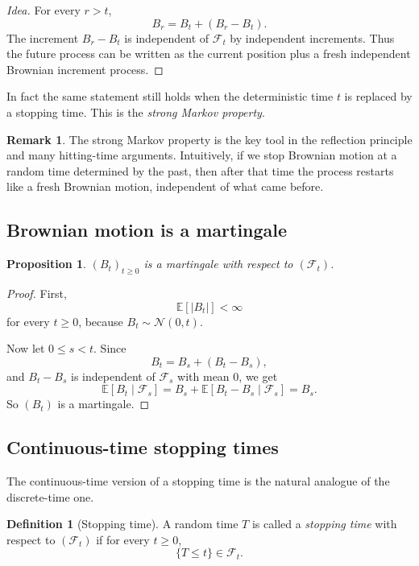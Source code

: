 \documentclass[11pt]{article}
\newtheorem{proposition}[theorem]{Proposition}
\theoremstyle{definition}
\newtheorem{definition}[theorem]{Definition}
\newtheorem{remark}[theorem]{Remark}
\begin{document}
\begin{proof}[Idea]
For every \(r>t\),
\[
B_r=B_t+(B_r-B_t).
\]
The increment \(B_r-B_t\) is independent of \(\mathcal F_t\) by independent increments. Thus the future process can be written as the current position plus a fresh independent Brownian increment process.
\end{proof}

In fact the same statement still holds when the deterministic time \(t\) is replaced by a stopping time. This is the \emph{strong Markov property}.

\begin{remark}
The strong Markov property is the key tool in the reflection principle and many hitting-time arguments. Intuitively, if we stop Brownian motion at a random time determined by the past, then after that time the process restarts like a fresh Brownian motion, independent of what came before.
\end{remark}

\subsection{Brownian motion is a martingale}

\begin{proposition}
\((B_t)_{t\ge 0}\) is a martingale with respect to \((\mathcal F_t)\).
\end{proposition}

\begin{proof}
First,
\[
\mathbb E[|B_t|]<\infty
\]
for every \(t\ge 0\), because \(B_t\sim\mathcal N(0,t)\).

Now let \(0\le s<t\). Since
\[
B_t=B_s+(B_t-B_s),
\]
and \(B_t-B_s\) is independent of \(\mathcal F_s\) with mean \(0\), we get
\[
\mathbb E[B_t\mid \mathcal F_s]
=
B_s+\mathbb E[B_t-B_s\mid \mathcal F_s]
=
B_s.
\]
So \((B_t)\) is a martingale.
\end{proof}

\subsection{Continuous-time stopping times}

The continuous-time version of a stopping time is the natural analogue of the discrete-time one.

\begin{definition}[Stopping time]
A random time \(T\) is called a \emph{stopping time} with respect to \((\mathcal F_t)\) if for every \(t\ge 0\),
\[
\{T\le t\}\in \mathcal F_t.
\]
\end{definition}
\end{document}
